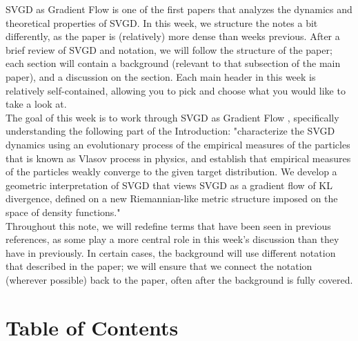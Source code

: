 \documentclass[12pt]{article}
\begin{document}
    \MakeScribeTop


\noindent SVGD as Gradient Flow is one of the first papers that analyzes the dynamics and theoretical properties of SVGD. In this week, we structure the notes a bit differently, as the paper is (relatively) more dense than weeks previous. After a brief review of SVGD and notation, we will follow the structure of the paper; each section will contain a background (relevant to that subsection of the main paper), and a discussion on the section. Each main header in this week is relatively self-contained, allowing you to pick and choose what you would like to take a look at.
\\

\noindent The goal of this week is to work through SVGD as Gradient Flow \cite{liu2017gradflow}, specifically understanding the following part of the Introduction: "characterize the SVGD dynamics using an evolutionary process of the empirical measures of the particles that is known as Vlasov process in physics, and establish that empirical measures of the particles weakly converge to the given target distribution. We develop a geometric interpretation of SVGD that views SVGD as a gradient flow of KL divergence, defined on a new Riemannian-like metric structure imposed on the space of density functions."
\\

\noindent Throughout this note, we will redefine terms that have been seen in previous references, as some play a more central role in this week's discussion than they have in previously. In certain cases, the background will use different notation that described in the paper; we will ensure that we connect the notation (wherever possible) back to the paper, often after the background is fully covered. 

\section{Table of Contents}
\end{document}
